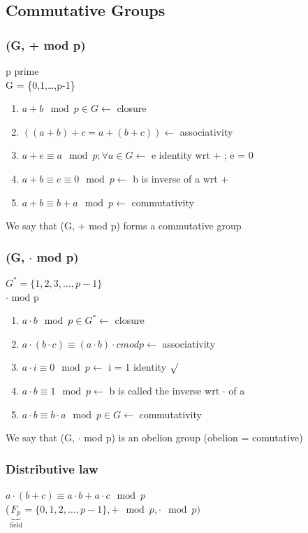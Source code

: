 \documentclass[12pt,a4paper]{article}
\begin{document}
\subsection{Commutative Groups}
\subsubsection{(G, + mod p)}
\begin{boiteV}{0.3}
p prime\\
G = \{0,1,\ldots,p-1\}
\end{boiteV}

\begin{enumerate}
\item $a+b \mod p \in G \leftarrow$ closure
\item $((a+b)+c = a+(b+c))\leftarrow$ associativity
\item $a+e \equiv a \mod p; \forall a \in G\leftarrow$ e identity wrt + ; e = 0
\item $a+b \equiv e \equiv 0 \mod p \leftarrow$ b is inverse of a wrt +
\item $a+b \equiv b+a \mod p \leftarrow$ commutativity
\end{enumerate}
We say that (G, + mod p) forms a commutative group
\subsubsection{(G, $\cdot$ mod p)}
\begin{boiteV}{0.35}
$G^* = \{1,2,3,\ldots,p-1\}$\\
$\cdot$ mod p
\end{boiteV}

\begin{enumerate}
\item $a \cdot b \mod p \in G^*\leftarrow$ closure
\item $a\cdot (b \cdot c) \equiv (a\cdot b) \cdot c mod p\leftarrow$ associativity
\item $a\cdot i \equiv 0 \mod p \leftarrow$ i = 1 identity $\surd$
\item $a\cdot b \equiv 1 \mod p\leftarrow$ b is called the inverse wrt $\cdot$ of a
\item $a\cdot b \equiv b \cdot a \mod p \in G \leftarrow$ commutativity
\end{enumerate}
We say that (G, $\cdot$ mod p) is an obelion group (obelion = comutative)
\subsubsection{Distributive law}
$a\cdot(b+c) \equiv a \cdot b +a \cdot c \mod p$\\
($\underbrace{F_p}_{\mbox{field}} = \{0,1,2,\ldots,p-1\}, + \mod p, \cdot \mod p)$
\end{document}
